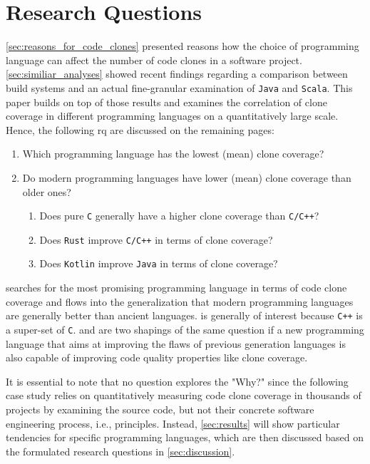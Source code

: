 
\section{Research Questions}
\label{sec:research_question}

\autoref{sec:reasons_for_code_clones} presented reasons how the choice of programming language can affect the number of code clones in a software project. \autoref{sec:similiar_analyses} showed recent findings regarding a comparison between build systems and an actual fine-granular examination of \texttt{Java} and \texttt{Scala}. This paper builds on top of those results and examines the correlation of clone coverage in different programming languages on a quantitatively large scale. Hence, the following \ac{rq} are discussed on the remaining pages:

\begin{enumerate}
	\item Which programming language has the lowest (mean) clone coverage? \label{question:clone_coverage_lowest}
	\item Do modern programming languages have lower (mean) clone coverage than older ones? \label{question:comparing_age}
	\begin{enumerate}
		\item Does pure \texttt{C} generally have a higher clone coverage than \texttt{C/C++}? \label{question:compare_c_cpp}
		\item Does \texttt{Rust} improve \texttt{C/C++} in terms of clone coverage? \label{question:compare_rust_c}
		\item Does \texttt{Kotlin} improve \texttt{Java} in terms of clone coverage? \label{question:compare_kotlin_java}
	\end{enumerate}
\end{enumerate}

 searches for the most promising programming language in terms of code clone coverage and flows into the generalization that modern programming languages are generally better than ancient languages.
 is generally of interest because \texttt{C++} is a super-set of \texttt{C}.   and  are two shapings of the same question if a new programming language that aims at improving the flaws of previous generation languages is also capable of improving code quality properties like clone coverage.

It is essential to note that no question explores the "Why?" since the following case study relies on quantitatively measuring code clone coverage in thousands of projects by examining the source code, but not their concrete software engineering process, i.e., principles. Instead, \autoref{sec:results} will show particular tendencies for specific programming languages, which are then discussed based on the formulated research questions in \autoref{sec:discussion}.

